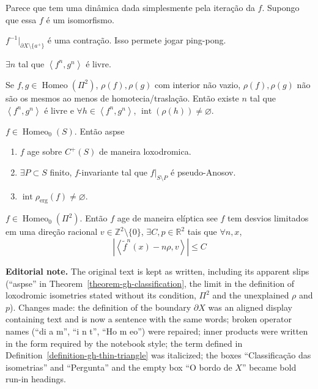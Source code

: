 \begin{remark}[Dani]
\label{remark-gh-dani}
Parece que tem uma dinâmica dada simplesmente
pela iteração da $f$. Supongo que essa $f$ é
um isomorfismo.
\end{remark}

$f^{-1}|_{\partial X\setminus \{a^+\}}$ é
uma contração. Isso permete jogar ping-pong.

\begin{exercise}
\label{exercise-gh-free}
$\exists n$ tal que
$\left\langle{} f^n,g^n \right\rangle{}$
é livre.
\end{exercise}

\begin{theorem}
\label{theorem-gh-hensel-le-raux}
Se $f,g\in\operatorname{Homeo}(\Pi^2)$,
$\rho(f),\rho(g)$ com interior não vazio,
$\rho(f),\rho(g)$ não são os mesmos ao menos
de homotecia/traslação. Então existe $n$ tal
que
$\left\langle{} f^n,g^n \right\rangle{}$
é livre e $\forall h\in
\left\langle{} f^n,g^n \right\rangle{}$,
$\operatorname{int}(\rho(h))\neq
\varnothing$.
\end{theorem}

\medskip{}

\begin{theorem}
\label{theorem-gh-classification}
$f\in\operatorname{Homeo}_0(S)$. Então aspse
\begin{enumerate}
\item[(i)] $f$ age sobre $C^+(S)$ de maneira
loxodromica.
\item[(ii)] $\exists P\subset S$ finito,
$f$-invariante tal que $f|_{S\setminus P}$ é
pseudo-Anosov.
\item[(iii)]
$\operatorname{int}\rho_{\operatorname{erg}}
(f)\neq \varnothing$.
\end{enumerate}
\end{theorem}

\begin{theorem}
\label{theorem-gh-torus}
$f\in\operatorname{Homeo}_0(\Pi^2)$.
Então $f$ age de maneira elíptica see $f$
tem desvios limitados em uma direção
racional $v\in\mathbb{Z}^2\setminus\{0\}$,
$\exists C,p\in\mathbb{R}^{2}$ tais que
$\forall n,x$,
$$
|\left\langle{} \tilde{f}^n(x)-n\rho,v
\right\rangle{} |\leq C
$$
\end{theorem}

\medskip\noindent
{\bf Editorial note.}
The original text is kept as written,
including its apparent slips (``aspse'' in
Theorem~\ref{theorem-gh-classification},
the limit in the definition of loxodromic
isometries stated without its condition,
$\Pi^2$ and the unexplained $\rho$ and $p$).
Changes made: the definition of the
boundary $\partial X$ was an aligned display
containing text and is now a sentence with
the same words; broken operator names
(``di a m'', ``i n t'', ``Ho m eo'') were
repaired; inner products were written in the
form required by the notebook style; the
term defined in
Definition~\ref{definition-gh-thin-triangle}
was italicized; the boxes ``Classificação
das isometrias'' and ``Pergunta'' and the
empty box ``O bordo de $X$'' became bold
run-in headings.

